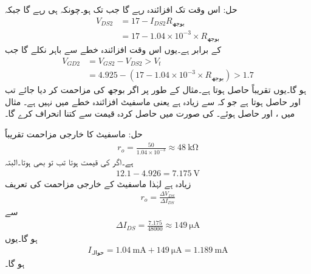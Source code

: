 حل: اس وقت تک افزائندہ رہے گا جب تک  ہو۔چونکہ  ہی رہے گا جبکہ
\begin{align*}
V_{DS2}&=17-I_{DS2} R_{\textrm{بوجھ} }\\
&=17-1.04 \times 10^{-3} \times R_{\textrm{بوجھ} }
\end{align*}
کے برابر ہے۔یوں  اس وقت افزائندہ خطے سے باہر نکلے گا جب 
\begin{align*}
V_{GD2}&=V_{GS2}-V_{DS2}> V_t\\
&=4.925-\left(17-1.04 \times 10^{-3} \times R_{\textrm{بوجھ} } \right) > 1.7
\end{align*} 
ہو گا۔یوں  تقریباً  حاصل ہوتا ہے۔مثال کے طور پر اگر بوجھ کی مزاحمت 
کر دیا جائے تب  اور  حاصل ہوتا ہے جو کہ  سے زیادہ ہے یعنی ماسفیٹ افزائندہ خطے میں نہیں ہے۔
مثال  میں ،  اور  حاصل ہوئے۔  کی صورت میں  حاصل کردہ قیمت سے کتنا انحراف کرے گا۔

حل: ماسفیٹ کا خارجی مزاحمت تقریباً
\begin{align*}
r_o=\frac{50}{1.04 \times 10^{-3}} \approx \SI{48}{\kilo \ohm}
\end{align*} 
ہے۔اگر  کی قیمت  ہوتا تب تو  بھی  ہوتا۔البتہ  
\begin{align*}
12.1-4.926=\SI{7.175}{\volt}
\end{align*}
زیادہ ہے لہٰذا ماسفیٹ کے خارجی مزاحمت کی تعریف
\begin{align*}
r_o=\frac{\Delta V_{DS}}{\Delta I_{DS}}
\end{align*}
سے
\begin{align*}
\Delta I_{DS}=\frac{7.175}{48000} \approx \SI{149}{\micro \ampere}
\end{align*}
ہو گا۔یوں
\begin{align*}
 I_{\textrm{حوالہ}}=\SI{1.04}{\milli \ampere}+\SI{149}{\micro \ampere}=\SI{1.189}{\milli \ampere}
\end{align*}
ہو گا۔

